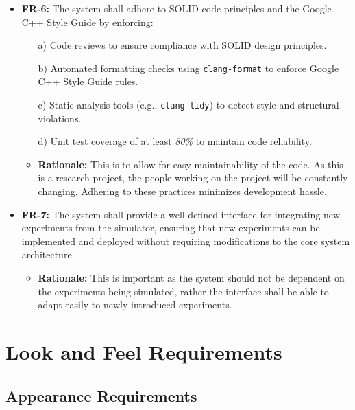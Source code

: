 \documentclass[12pt]{article}
\begin{document}
\begin{itemize}
\begin{itemize}
  \end{itemize}
\item \label{FR-6} \textbf{FR-6:} The system shall adhere to SOLID code principles and the Google C++ Style Guide by enforcing:
  \begin{itemize}
      \item[a)] Code reviews to ensure compliance with SOLID design principles.
      \item[b)] Automated formatting checks using \texttt{clang-format} to enforce Google C++ Style Guide rules.
      \item[c)] Static analysis tools (e.g., \texttt{clang-tidy}) to detect style and structural violations.
      \item[d)] Unit test coverage of at least \textit{80\%} to maintain code reliability.
  \end{itemize}
\begin{itemize}
  \item \textbf{Rationale:} This is to allow for easy maintainability of the code. As this is a research project, the people working on the project will be constantly changing. Adhering to these practices minimizes development hassle.
\end{itemize}
\item \label{FR-8} \textbf{FR-7:} The system shall provide a well-defined interface for integrating new experiments from the simulator, ensuring that new experiments can be implemented and deployed without requiring modifications to the core system architecture.
  \begin{itemize}
    \item \textbf{Rationale:} This is important as the system should not be dependent on the experiments being simulated, rather the interface shall be able to adapt easily to newly introduced experiments. 
  \end{itemize}
\end{itemize}
\section{Look and Feel Requirements}

\subsection{Appearance Requirements}
\end{document}
